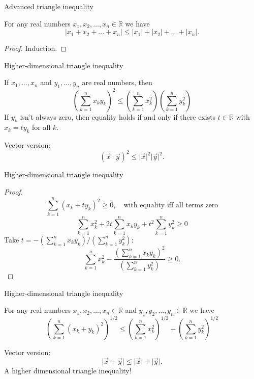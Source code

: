 \documentclass{beamer}
\begin{document}
\begin{frame}{Advanced triangle inequality}
\begin{thm}
For any real numbers $x_1,x_2,\dots,x_n\in\mathbb{R}$ we have
$$\lvert x_1+x_2+\dots+x_n\rvert\leq \lvert x_1 \rvert + \lvert x_2\rvert +  \dots + \lvert x_n\rvert.$$
\end{thm}
\pause
\begin{proof}
Induction.
\end{proof}
\end{frame}

\begin{frame}{Higher-dimensional triangle inequality}
\begin{thm}
If $x_1,\dots,x_n$ and $y_1,\dots, y_n$ are real numbers, then
$$\left(\sum_{k=1}^n x_ky_k\right)^2\leq \left(\sum_{k=1}^n x_k^2\right)\left(\sum_{k=1}^n y_k^2\right)$$
If $y_k$ isn't always zero, then equality holds if and only if there exists $t\in\mathbb{R}$ with $x_k = ty_k$ for all $k$.
\end{thm}
\pause
Vector version:
$$(\vec x\cdot\vec y)^2 \leq \lvert \vec x\rvert^2\lvert \vec y\rvert^2.$$
\end{frame}

\begin{frame}{Higher-dimensional triangle inequality}
\begin{proof}
$$\sum_{k=1}^n (x_k + ty_k)^2\geq 0,\quad \text{with equality iff all terms zero}$$
$$\sum_{k=1}^n x_k^2 + 2t\sum_{k=1}^n x_ky_k + t^2\sum_{k=1}^ny_k^2\geq 0$$
Take $t = -\left(\sum_{k=1}^n x_ky_k\right)/\left(\sum_{k=1}^ny_k^2\right):$
$$\sum_{k=1}^n x_k^2 -\frac{ \left(\sum_{k=1}^n x_ky_k\right)^2}{\left(\sum_{k=1}^ny_k^2\right)}\geq 0.$$
\end{proof}
\end{frame}

\begin{frame}{Higher-dimensional triangle inequality}
\begin{thm}
For any real numbers $x_1,x_2,\dots,x_n\in\mathbb{R}$ and $y_1,y_2,\dots,y_n\in\mathbb{R}$ we have
$$\left(\sum_{k=1}^n (x_k+y_k)^2\right)^{1/2}\leq \left(\sum_{k=1}^n x_k^2\right)^{1/2} + \left(\sum_{k=1}^ny_k^2\right)^{1/2}$$
\end{thm}
\pause
Vector version:
$$\lvert \vec x+\vec y\rvert \leq \lvert \vec x\rvert + \lvert\vec y\rvert.$$
\pause
A higher dimensional triangle inequality!
\end{frame}
\end{document}
